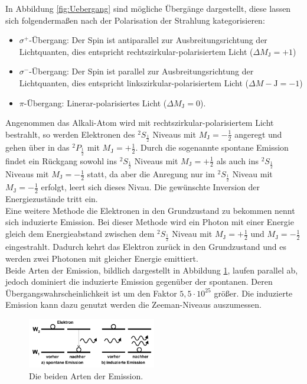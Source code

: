 In Abbildung \ref{fig:Uebergang} sind mögliche Übergänge dargestellt, diese lassen sich folgendermaßen nach der Polarisation der Strahlung kategorisieren:
\begin{itemize}
  \item{$\sigma^+$-Übergang: Der Spin ist antiparallel zur Ausbreitungsrichtung der Lichtquanten, dies entspricht rechtszirkular-polarisiertem Licht ($\Delta M_\mathrm{J}=+1$)}
  \item{$\sigma^-$-Übergang: Der Spin ist parallel zur Ausbreitungsrichtung der Lichtquanten, dies entspricht linkszirkular-polarisiertem Licht ($\Delta M-\mathrm{J}=-1$)}
  \item{$\pi$-Übergang: Linerar-polarisiertes Licht ($\Delta M_\mathrm{J}=0$)}.
\end{itemize}
Angenommen das Alkali-Atom wird mit rechtszirkular-polarisiertem Licht bestrahlt, so werden Elektronen des $^2S_\mathrm{\frac{1}{2}}$ Niveaus mit $M_\mathrm{J}=-\frac{1}{2}$
angeregt und
gehen über in das $^2P_\mathrm{\frac{1}{2}}$ mit $M_\mathrm{J}=+\frac{1}{2}$. Durch die sogenannte spontane Emission findet ein Rückgang sowohl ins
 $^2S_\mathrm{\frac{1}{2}}$ Niveaus mit $M_\mathrm{J}=+\frac{1}{2}$ als auch ins $^2S_\mathrm{\frac{1}{2}}$ Niveaus mit $M_\mathrm{J}=-\frac{1}{2}$ statt,
da aber die Anregung nur im $^2S_\mathrm{\frac{1}{2}}$ Niveau mit $M_\mathrm{J}=-\frac{1}{2}$ erfolgt, leert sich dieses Nivau.
Die gewünschte Inversion der Energiezustände tritt ein.\\
Eine weitere Methode die Elektronen in den Grundzustand zu bekommen nennt sich induzierte Emission.
Bei dieser Methode wird ein Photon mit einer Energie gleich dem Energieabstand zwischen dem $^2S_\mathrm{\frac{1}{2}}$ Niveau mit $M_\mathrm{J}=+\frac{1}{2}$
und  $M_\mathrm{J}=-\frac{1}{2}$ eingestrahlt. Dadurch kehrt das Elektron zurück in
den Grundzustand und es werden zwei Photonen mit gleicher Energie emittiert.\\
Beide Arten der Emission, bildlich dargestellt in Abbildung \ref{fig:emission}, laufen parallel ab, jedoch dominiert die induzierte Emission gegenüber der spontanen.
Deren Übergangswahrscheinlichkeit ist um den Faktor $5,5\cdot10^{25}$ größer. Die induzierte Emission kann dazu genutzt werden die Zeeman-Niveaus auszumessen.
\begin{figure}
    \centering
    \includegraphics[width=0.5\textwidth]{emission.PNG}
    \caption{Die beiden Arten der Emission.\cite{skript}}
    \label{fig:emission}
\end{figure}

